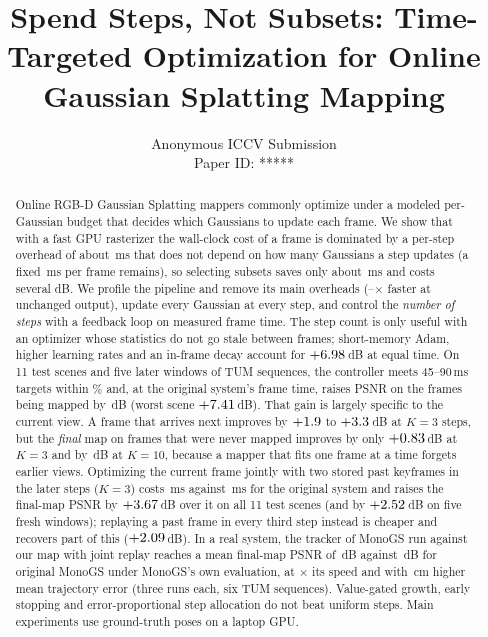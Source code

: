 \documentclass[10pt,twocolumn,letterpaper]{article}
\title{\textbf{Spend Steps, Not Subsets: Time-Targeted Optimization for Online Gaussian Splatting Mapping}}
\author{Anonymous ICCV Submission\\Paper ID: *****}
\begin{document}
\maketitle
\begin{abstract}
Online RGB-D Gaussian Splatting mappers commonly optimize under a modeled per-Gaussian budget that decides which Gaussians to update each frame. We show that with a fast GPU rasterizer the wall-clock cost of a frame is dominated by a per-step overhead of about \engCostSlope\,ms that does not depend on how many Gaussians a step updates (a fixed \engCostIntercept\,ms per frame remains), so selecting subsets saves only about \engSubsetTimeSaved\,ms and costs several dB. We profile the pipeline and remove its main overheads (\engSpeedupMin--\engSpeedupMax$\times$ faster at unchanged output), update every Gaussian at every step, and control the \emph{number of steps} with a feedback loop on measured frame time. The step count is only useful with an optimizer whose statistics do not go stale between frames; short-memory Adam, higher learning rates and an in-frame decay account for $+6.98$\,dB at equal time. On 11 test scenes and five later windows of TUM sequences, the controller meets 45--90\,ms targets within \engHitMaxPct\% and, at the original system's frame time, raises PSNR on the frames being mapped by \engTestTtsVggTFourFiveGainMean\,dB (worst scene $+7.41$\,dB). That gain is largely specific to the current view. A frame that arrives next improves by $+1.9$ to $+3.3$\,dB at $K{=}3$ steps, but the \emph{final} map on frames that were never mapped improves by only $+0.83$\,dB at $K{=}3$ and by \engKeepDTestKOneZeroMinusOrigMean\,dB at $K{=}10$, because a mapper that fits one frame at a time forgets earlier views. Optimizing the current frame jointly with two stored past keyframes in the later steps ($K{=}3$) costs \engMsKThreeJr\,ms against \engMsOrig\,ms for the original system and raises the final-map PSNR by $+3.67$\,dB over it on all 11 test scenes (and by $+2.52$\,dB on five fresh windows); replaying a past frame in every third step instead is cheaper and recovers part of this ($+2.09$\,dB). In a real system, the tracker of MonoGS run against our map with joint replay reaches a mean final-map PSNR of \engHybKThreeJrPsnr\,dB against \engHybMonoPsnr\,dB for original MonoGS under MonoGS's own evaluation, at \engHybSpeedup$\times$ its speed and with \engHybAteDiff\,cm higher mean trajectory error (three runs each, six TUM sequences). Value-gated growth, early stopping and error-proportional step allocation do not beat uniform steps. Main experiments use ground-truth poses on a laptop GPU.
\end{abstract}
\end{document}
